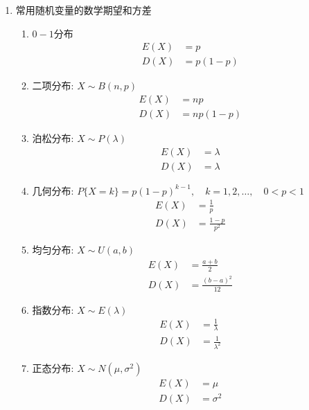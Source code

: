 \begin{enumerate}
	\item 常用随机变量的数学期望和方差
	\begin{enumerate}
		\item $0-1$分布
		\begin{align}
			E(X) &= p \\
			D(X) &= p(1-p)
		\end{align}
		\item 二项分布: $X \sim B(n,p)$
		\begin{align}
			E(X) &= np \\
			D(X) &= np(1-p)
		\end{align}
		\item 泊松分布: $X \sim P(\lambda)$
		\begin{align}
			E(X) &= \lambda \\
			D(X) &= \lambda
		\end{align}
		\item 几何分布: $P\{X=k\} = p(1-p)^{k-1}, \quad k = 1, 2, \dots, \quad 0<p<1$
		\begin{align}
			E(X) &= \frac{1}{p} \\
			D(X) &= \frac{1-p}{p^2}
		\end{align}
		\item 均匀分布: $X \sim U(a,b)$
		\begin{align}
			E(X) &= \frac{a+b}{2} \\
			D(X) &= \frac{(b-a)^2}{12}
		\end{align}
		\item 指数分布: $X \sim E(\lambda)$
		\begin{align}
			E(X) &= \frac{1}{\lambda} \\
			D(X) &= \frac{1}{\lambda^2}
		\end{align}
		\item 正态分布: $X \sim N(\mu, \sigma^2)$
		\begin{align}
			E(X) &= \mu \\
			D(X) &= \sigma^2
		\end{align}
	\end{enumerate}
\end{enumerate}

